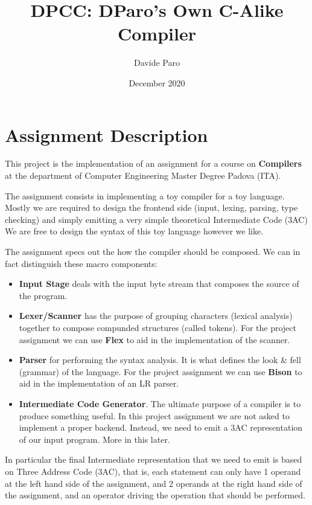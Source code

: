 \documentclass[a4paper]{article}
\begin{document}
\tableofcontents


\title{DPCC: DParo's Own C-Alike Compiler}
\author{Davide Paro}
\date{December 2020}

\maketitle


\section{Assignment Description}
This project is the implementation of an assignment for a course on \textbf{Compilers}
at the department of Computer Engineering Master Degree Padova (ITA).


The assignment consists in implementing a toy compiler for a toy language.
Mostly we are required to design the frontend side (input, lexing, parsing, type checking) and
simply emitting a very simple theoretical Intermediate Code (3AC)
We are free to design the syntax of this toy language however we like.

The assignment specs out the how the compiler should be composed.
We can in fact distinguish these macro components:

\begin{itemize}
\item \textbf{Input Stage} deals with the input byte stream that composes
    the source of the program.
\item \textbf{Lexer/Scanner} has the purpose of grouping characters (lexical analysis)
    together to compose compunded
    structures (called tokens). For the project assignment we can use \textbf{Flex} to aid in
    the implementation of the scanner.
\item \textbf{Parser} for performing the syntax analysis. It is what defines the look \& fell
    (grammar) of the language. For the project assignment we can use \textbf{Bison} to aid in the
    implementation of an LR parser.
\item \textbf{Intermediate Code Generator}. The ultimate purpose of a compiler is to produce something
    useful. In this project assignment we are not asked to implement a proper backend. Instead,
    we need to emit a 3AC representation of our input program. More in this later.
\end{itemize}

In particular the final Intermediate representation that we need to emit is based on Three Address Code (3AC),
that is, each statement can only have 1 operand at the left hand side of the assignment, and 2 operands at the right hand side
of the assignment, and an operator driving the operation that should be performed.
\end{document}
